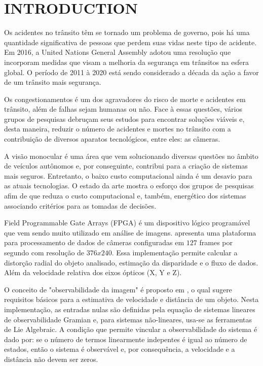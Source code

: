 \section{INTRODUCTION}

Os acidentes no trânsito têm se tornado um problema de governo, pois há uma quantidade significativa de pessoas que
perdem suas vidas neste tipo de acidente. Em 2016, a United Nations General Assembly adotou uma resolução que incorporam medidas que visam 
a melhoria da segurança em trânsitos na esfera global. O período de 2011 à 2020 está sendo considerado a década da ação a favor
de um trânsito mais segurança.

Os congestionamentos é um dos agravadores do risco de morte e acidentes em trânsito, além de falhas sejam humanas ou não. 
Face à essas questões, vários grupos de pesquisas debruçam seus estudos para encontrar soluções viáveis e, desta maneira,
reduzir o número de acidentes e mortes no trânsito com a contribuição de diversos aparatos tecnológicos, entre eles: as câmeras.

A visão monocular é uma área que vem solucionando diversas questões no âmbito de veículos autônomos e, por conseguinte, 
contribui para a criação de sistemas mais seguros. Entretanto, o baixo custo computacional ainda é um desavio 
para as atuais tecnologias. O estado da arte mostra o esforço dos grupos de pesquisas afim de que reduza o custo computacional e,
também, energético dos sistemas associando critérios para as tomadas de decisões.

Field Programmable Gate Arrays (FPGA) é um dispositivo lógico programável que vem sendo muito utilizado em análise de imagens. \cite{Honegger}
apresenta uma plataforma para processamento de dados de câmeras configuradas em $127$ frames por segundo com resolução de $376x240$. Essa 
implementação permite calcular a distorção radial do objeto analisado, estimação da disparidade e o fluxo de dados. Além da 
velocidade relativa dos eixos ópticos (X, Y e Z).

O conceito de "observabilidade da imagem" é proposto em \cite{Breugel}, o qual sugere requisitos básicos para a estimativa de velocidade e 
distância de um objeto. Nesta implementação, as entradas nulas são definidas pela equação de sistemas lineares de observabilidade Gramian e,
para sistemas não-lineares, usa-se as ferramentas de Lie Algebraic. A condição que permite vincular a observabilidade do sistema é dado por:
se o número de termos linearmente indepentes é igual ao número de estados, então o sistema é observável e, por consequência, a velocidade e a 
distância não devem ser zeros.

